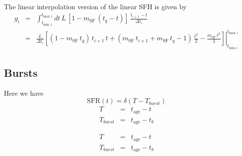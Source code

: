 \documentclass[12pt, letterpaper, preprint]{aastex}
\newcommand{\tmin}[1][]{t_{\mathrm{min} #1}}
\newcommand{\tmax}[1][]{t_{\mathrm{max} #1}}
\newcommand{\dt}{\Delta t_i}
\newcommand{\tintegral}{\int_{\tmin[,i]}^{\tmax[,i]} dt}
\newcommand{\tinterval}{\right|_{\tmin[,i]}^{\tmax[,i]}}
\newcommand{\tage}{t_{\mathrm{age}}}
\newcommand{\sfslope}{m_{\mathrm{SF}}}
\begin{document}
The linear interpolation version of the linear SFH is given by 
\begin{eqnarray}
g_i  & = & \tintegral \,  L\, \left[1 - \sfslope \, (t_q - t)\right] \, \frac{t_{i+1} - t}{\dt}  \nonumber \\
      & = & \frac{L}{\dt} \left.\left[(1-\sfslope\, t_q) \, t_{i+1} \, t + \left(\sfslope\, t_{i+1} + \sfslope \, t_q -1\right)\, \frac{t^2}{2} - \frac{\sfslope\, t^3}{3}\right] \tinterval
\end{eqnarray}


\subsection{Bursts}

Here we have 
\[ 
\mathrm{SFR}(t) = \delta(T - T_{burst})
\]
\begin{eqnarray}
T & = & \tage - t \nonumber \\
T_{burst} & = & \tage - t_b
\end{eqnarray}

\begin{eqnarray}
T & = & \tage - t \nonumber \\
T_{burst} & = & \tage - t_b
\end{eqnarray}
\end{document}

